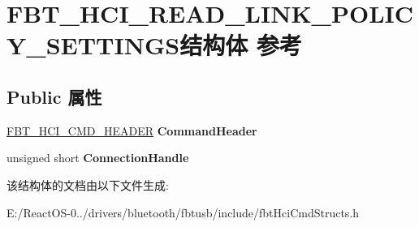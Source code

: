 \hypertarget{struct_f_b_t___h_c_i___r_e_a_d___l_i_n_k___p_o_l_i_c_y___s_e_t_t_i_n_g_s}{}\section{F\+B\+T\+\_\+\+H\+C\+I\+\_\+\+R\+E\+A\+D\+\_\+\+L\+I\+N\+K\+\_\+\+P\+O\+L\+I\+C\+Y\+\_\+\+S\+E\+T\+T\+I\+N\+G\+S结构体 参考}
\label{struct_f_b_t___h_c_i___r_e_a_d___l_i_n_k___p_o_l_i_c_y___s_e_t_t_i_n_g_s}
\subsection*{Public 属性}
\begin{DoxyCompactItemize}
\item 
\mbox{\label{struct_f_b_t___h_c_i___r_e_a_d___l_i_n_k___p_o_l_i_c_y___s_e_t_t_i_n_g_s_afec5defbc1f240204ae861216c66feab}} 
\hyperlink{struct_f_b_t___h_c_i___c_m_d___h_e_a_d_e_r}{F\+B\+T\+\_\+\+H\+C\+I\+\_\+\+C\+M\+D\+\_\+\+H\+E\+A\+D\+ER} {\bfseries Command\+Header}
\item 
\mbox{\label{struct_f_b_t___h_c_i___r_e_a_d___l_i_n_k___p_o_l_i_c_y___s_e_t_t_i_n_g_s_ac44897f096329d641154d8f6b5f7a7f8}} 
unsigned short {\bfseries Connection\+Handle}
\end{DoxyCompactItemize}


该结构体的文档由以下文件生成\+:\begin{DoxyCompactItemize}
\item 
E\+:/\+React\+O\+S-\/0../drivers/bluetooth/fbtusb/include/fbt\+Hci\+Cmd\+Structs.\+h\end{DoxyCompactItemize}
